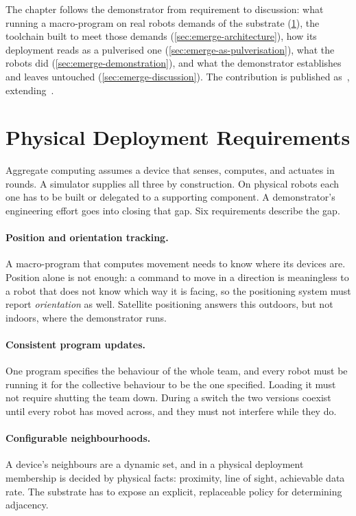The chapter follows the demonstrator from requirement to discussion:
what running a macro-program on real robots demands of the substrate (\cref{sec:emerge-requirements}),
the toolchain built to meet those demands (\cref{sec:emerge-architecture}),
how its deployment reads as a pulverised one (\cref{sec:emerge-as-pulverisation}),
what the robots did (\cref{sec:emerge-demonstration}),
and what the demonstrator establishes and leaves untouched (\cref{sec:emerge-discussion}).
%
The contribution is published as~\cite{Farabegoli:2027:ProjectEmerge}, extending~\cite{DBLP:conf/coordination/AguzziBBCCDFPV25}.

\section{Physical Deployment Requirements}
\label{sec:emerge-requirements}

Aggregate computing assumes a device that senses, computes, and actuates in rounds.
%
A simulator supplies all three by construction.
On physical robots each one has to be built or delegated to a supporting component.
A demonstrator's engineering effort goes into closing that gap.
%
Six requirements describe the gap.

\paragraph{Position and orientation tracking.}
A macro-program that computes movement needs to know where its devices are.
%
Position alone is not enough:
a command to move in a direction is meaningless to a robot that does not know which way it is facing,
so the positioning system must report \emph{orientation} as well.
%
Satellite positioning answers this outdoors, but not indoors, where the demonstrator runs.

\paragraph{Consistent program updates.}
One program specifies the behaviour of the whole team,
and every robot must be running it for the collective behaviour to be the one specified.
%
Loading it must not require shutting the team down.
%
During a switch the two versions coexist until every robot has moved across,
and they must not interfere while they do.

\paragraph{Configurable neighbourhoods.}
A device's neighbours are a dynamic set, and in a physical deployment membership is decided by physical facts:
proximity, line of sight, achievable data rate.
%
The substrate has to expose an explicit, replaceable policy for determining adjacency.


